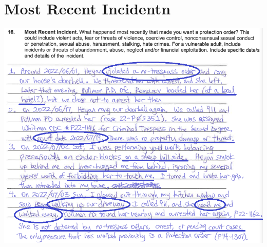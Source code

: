 \documentclass[9pt, b5paper]{article}
\begin{document}
\section{Most Recent Incidentn}
\label{sec-4}

\includegraphics[width=.9\linewidth]{./pic/dearCousin_20220919_183412.png}
\end{document}
